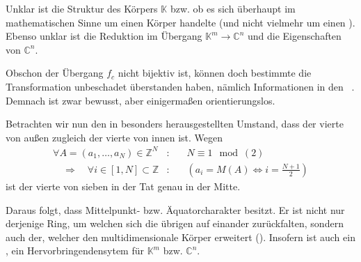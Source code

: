 Unklar ist die Struktur des Körpers $\mathbb{K}$ bzw. ob es sich überhaupt im mathematischen Sinne um einen Körper handelte (und nicht vielmehr um einen ). Ebenso unklar ist die Reduktion im Übergang  $\mathbb{K}^m \rightarrow \mathbb{C}^n$ und die Eigenschaften von $\mathbb{C}^n$. 

Obschon der Übergang  $f_c$ nicht bijektiv ist, können doch bestimmte  die Transformation unbeschadet überstanden haben, nämlich Informationen in den ~\cite[S. 28]{cbasebook}. Demnach ist  zwar bewusst, aber einigermaßen orientierungslos.

    Betrachten wir nun den in  besonders herausgestellten Umstand, dass der vierte  von außen zugleich der vierte von innen ist. Wegen
        \begin{equation}
        \begin{array}{rcl}
            \forall A = (a_1,\ldots,a_N) \in \mathbb{Z}^N&:&
            \quad
            N\equiv 1\mod(2)\\
            \quad\Rightarrow\quad
            \forall i \in [1,N] \subset \mathbb{Z}&:&
            \quad
            \left(
            a_i = M(A) \Leftrightarrow i = \frac{N+1}{2}
            \right)
        \end{array}
        \end{equation}
    ist der vierte  von sieben in der Tat genau in der Mitte.

    Daraus folgt, dass   Mittelpunkt- bzw. Äquatorcharakter besitzt. 
    Er ist nicht nur derjenige Ring, um welchen sich die übrigen  auf einander zurückfalten, sondern auch der, welcher den multidimensionale Körper erweitert (). Insofern ist  auch ein , ein Hervorbringendensytem für $\mathbb{K}^m$ bzw. $\mathbb{C}^n$.


